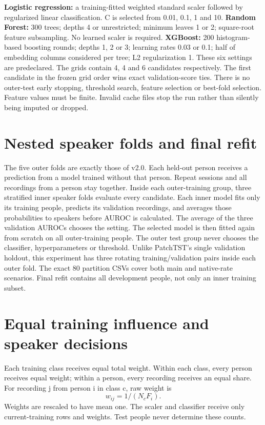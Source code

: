 \documentclass[11pt,a4paper]{article}
\begin{document}
\textbf{Logistic regression:} a training-fitted weighted standard scaler followed
by regularized linear classification. C is selected from 0.01, 0.1, 1 and 10.
\textbf{Random Forest:} 300 trees; depths 4 or unrestricted; minimum leaves
1 or 2; square-root feature subsampling. No learned scaler is required.
\textbf{XGBoost:} 200 histogram-based boosting rounds; depths 1, 2 or 3;
learning rates 0.03 or 0.1; half of embedding columns considered per tree;
L2 regularization 1. These six settings are predeclared.
The grids contain 4, 4 and 6 candidates respectively. The first candidate in
the frozen grid order wins exact validation-score ties. There is no outer-test
early stopping, threshold search, feature selection or best-fold selection.
Feature values must be finite. Invalid cache files stop the run rather than
silently being imputed or dropped.
\clearpage\section{Nested speaker folds and final refit}
The five outer folds are exactly those of v2.0. Each held-out person receives
a prediction from a model trained without that person. Repeat sessions and
all recordings from a person stay together.
Inside each outer-training group, three stratified inner speaker folds evaluate
every candidate. Each inner model fits only its training people, predicts its
validation recordings, and averages those probabilities to speakers before AUROC
is calculated. The average of the three validation AUROCs chooses the setting.
The selected model is then fitted again from scratch on all outer-training people.
The outer test group never chooses the classifier, hyperparameters or threshold.
Unlike PatchTST's single validation holdout, this experiment has three rotating
training/validation pairs inside each outer fold. The exact 80 partition CSVs
cover both main and native-rate scenarios. Final refit contains all development
people, not only an inner training subset.
\clearpage\section{Equal training influence and speaker decisions}
Each training class receives equal total weight. Within each class, every person
receives equal weight; within a person, every recording receives an equal share.
For recording j from person i in class c, raw weight is
\[
w_{ij}=1/(N_c F_i).
\]
Weights are rescaled to have mean one. The scaler and classifier receive only
current-training rows and weights. Test people never determine these counts.
\end{document}
